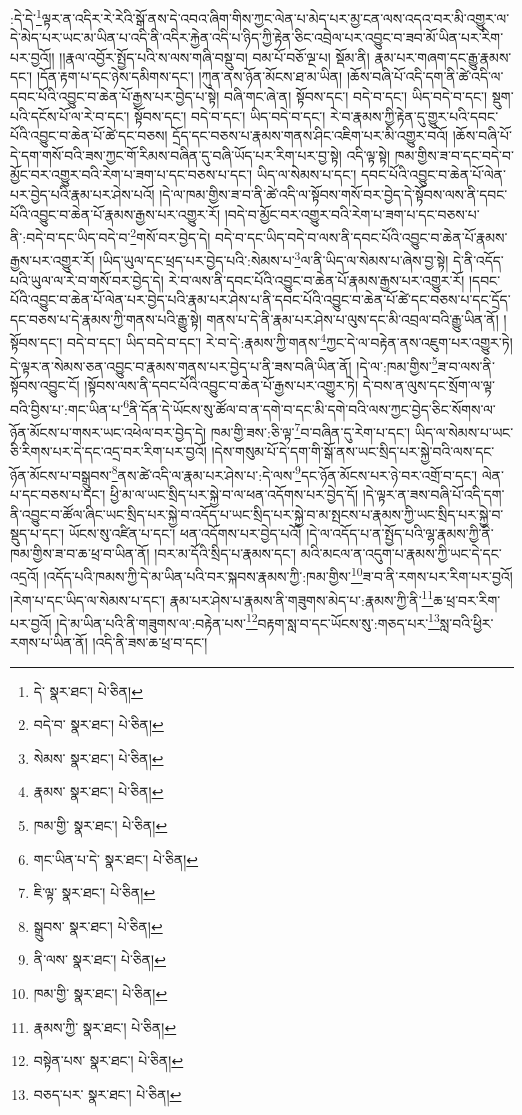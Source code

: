 :དེ་དེ་\footnote{དེ་  སྣར་ཐང་།  པེ་ཅིན། }ལྟར་ན་འདིར་རེ་རེའི་སྒོ་ནས་དེ་འབའ་ཞིག་གིས་ཀྱང་ལེན་པ་མེད་པར་མྱ་ངན་ལས་འདའ་བར་མི་འགྱུར་ལ་དེ་མེད་པར་ཡང་མ་ཡིན་པ་འདི་ནི་འདིར་རྐྱེན་འདི་པ་ཉིད་ཀྱི་རྟེན་ཅིང་འབྲེལ་པར་འབྱུང་བ་ཟབ་མོ་ཡིན་པར་རིག་པར་བྱའོ།། །།རྣལ་འབྱོར་སྤྱོད་པའི་ས་ལས་གཞི་བསྡུ་བ། བམ་པོ་བཅོ་ལྔ་པ། སྡོམ་ནི། རྣམ་པར་གཞག་དང་རྒྱུ་རྣམས་དང་། །དོན་རྟག་པ་དང་ཉེས་དམིགས་དང་། །ཀུན་ནས་ཉོན་མོངས་ཐ་མ་ཡིན། །ཆོས་བཞི་པོ་འདི་དག་ནི་ཚེ་འདི་ལ་དབང་པོའི་འབྱུང་བ་ཆེན་པོ་རྒྱས་པར་བྱེད་པ་སྟེ། བཞི་གང་ཞེ་ན། སྟོབས་དང་། བདེ་བ་དང་། ཡིད་བདེ་བ་དང་། སྡུག་པའི་དངོས་པོ་ལ་རེ་བ་དང་། སྟོབས་དང་། བདེ་བ་དང་། ཡིད་བདེ་བ་དང་། རེ་བ་རྣམས་ཀྱི་རྟེན་དུ་གྱུར་པའི་དབང་པོའི་འབྱུང་བ་ཆེན་པོ་ཚེ་དང་བཅས། དྲོད་དང་བཅས་པ་རྣམས་གནས་ཤིང་འཇིག་པར་མི་འགྱུར་བའོ། །ཆོས་བཞི་པོ་དེ་དག་གསོ་བའི་ཟས་ཀྱང་གོ་རིམས་བཞིན་དུ་བཞི་ཡོད་པར་རིག་པར་བྱ་སྟེ། འདི་ལྟ་སྟེ། ཁམ་གྱིས་ཟ་བ་དང་བདེ་བ་མྱོང་བར་འགྱུར་བའི་རེག་པ་ཟག་པ་དང་བཅས་པ་དང་། ཡིད་ལ་སེམས་པ་དང་། དབང་པོའི་འབྱུང་བ་ཆེན་པོ་ལེན་པར་བྱེད་པའི་རྣམ་པར་ཤེས་པའོ། །དེ་ལ་ཁམ་གྱིས་ཟ་བ་ནི་ཚེ་འདི་ལ་སྟོབས་གསོ་བར་བྱེད་དེ་སྟོབས་ལས་ནི་དབང་པོའི་འབྱུང་བ་ཆེན་པོ་རྣམས་རྒྱས་པར་འགྱུར་རོ། །བདེ་བ་མྱོང་བར་འགྱུར་བའི་རེག་པ་ཟག་པ་དང་བཅས་པ་ནི་:བདེ་བ་དང་ཡིད་བདེ་བ་\footnote{བདེ་བ་  སྣར་ཐང་།  པེ་ཅིན། }གསོ་བར་བྱེད་དེ། བདེ་བ་དང་ཡིད་བདེ་བ་ལས་ནི་དབང་པོའི་འབྱུང་བ་ཆེན་པོ་རྣམས་རྒྱས་པར་འགྱུར་རོ། །ཡིད་ཡུལ་དང་ཕྲད་པར་བྱེད་པའི་:སེམས་པ་\footnote{སེམས་  སྣར་ཐང་།  པེ་ཅིན། }ལ་ནི་ཡིད་ལ་སེམས་པ་ཞེས་བྱ་སྟེ། དེ་ནི་འདོད་པའི་ཡུལ་ལ་རེ་བ་གསོ་བར་བྱེད་དེ། རེ་བ་ལས་ནི་དབང་པོའི་འབྱུང་བ་ཆེན་པོ་རྣམས་རྒྱས་པར་འགྱུར་རོ། །དབང་པོའི་འབྱུང་བ་ཆེན་པོ་ལེན་པར་བྱེད་པའི་རྣམ་པར་ཤེས་པ་ནི་དབང་པོའི་འབྱུང་བ་ཆེན་པོ་ཚེ་དང་བཅས་པ་དང་དྲོད་དང་བཅས་པ་དེ་རྣམས་ཀྱི་གནས་པའི་རྒྱུ་སྟེ། གནས་པ་དེ་ནི་རྣམ་པར་ཤེས་པ་ལུས་དང་མི་འབྲལ་བའི་རྒྱུ་ཡིན་ནོ། །སྟོབས་དང་། བདེ་བ་དང་། ཡིད་བདེ་བ་དང་། རེ་བ་དེ་:རྣམས་ཀྱི་གནས་\footnote{རྣམས་  སྣར་ཐང་།  པེ་ཅིན། }ཀྱང་དེ་ལ་བརྟེན་ནས་འཇུག་པར་འགྱུར་ཏེ། དེ་ལྟར་ན་སེམས་ཅན་འབྱུང་བ་རྣམས་གནས་པར་བྱེད་པ་ནི་ཟས་བཞི་ཡིན་ནོ། །དེ་ལ་:ཁམ་གྱིས་\footnote{ཁམ་གྱི་  སྣར་ཐང་།  པེ་ཅིན། }ཟ་བ་ལས་ནི་སྟོབས་འབྱུང་ངོ། །སྟོབས་ལས་ནི་དབང་པོའི་འབྱུང་བ་ཆེན་པོ་རྒྱས་པར་འགྱུར་ཏེ། དེ་བས་ན་ལུས་དང་སྲོག་ལ་ལྟ་བའི་བྱིས་པ་:གང་ཡིན་པ་\footnote{གང་ཡིན་པ་དེ་  སྣར་ཐང་།  པེ་ཅིན། }ནི་དོན་དེ་ཡོངས་སུ་ཚོལ་བ་ན་དགེ་བ་དང་མི་དགེ་བའི་ལས་ཀྱང་བྱེད་ཅིང་སོགས་ལ་ཉོན་མོངས་པ་གསར་ཡང་འཕེལ་བར་བྱེད་དེ། ཁམ་གྱི་ཟས་:ཅི་ལྟ་\footnote{ཇི་ལྟ་  སྣར་ཐང་།  པེ་ཅིན། }བ་བཞིན་དུ་རེག་པ་དང་། ཡིད་ལ་སེམས་པ་ཡང་ཅི་རིགས་པར་དེ་དང་འདྲ་བར་རིག་པར་བྱའོ། །དེས་གསུམ་པོ་དེ་དག་གི་སྒོ་ནས་ཡང་སྲིད་པར་སྐྱེ་བའི་ལས་དང་ཉོན་མོངས་པ་བསྒྲུབས་\footnote{སྒྲུབས་  སྣར་ཐང་།  པེ་ཅིན། }ནས་ཚེ་འདི་ལ་རྣམ་པར་ཤེས་པ་:དེ་ལས་\footnote{ནི་ལས་  སྣར་ཐང་།  པེ་ཅིན། }དང་ཉོན་མོངས་པར་ཉེ་བར་འགྲོ་བ་དང་། ལེན་པ་དང་བཅས་པ་དང་། ཕྱི་མ་ལ་ཡང་སྲིད་པར་སྐྱེ་བ་ལ་ཕན་འདོགས་པར་བྱེད་དོ། །དེ་ལྟར་ན་ཟས་བཞི་པོ་འདི་དག་ནི་འབྱུང་བ་ཚོལ་ཞིང་ཡང་སྲིད་པར་སྐྱེ་བ་འདོད་པ་ཡང་སྲིད་པར་སྐྱེ་བ་མ་སྤངས་པ་རྣམས་ཀྱི་ཡང་སྲིད་པར་སྐྱེ་བ་སྡུད་པ་དང་། ཡོངས་སུ་འཛིན་པ་དང་། ཕན་འདོགས་པར་བྱེད་པའོ། །དེ་ལ་འདོད་པ་ན་སྤྱོད་པའི་ལྷ་རྣམས་ཀྱི་ནི་ཁམ་གྱིས་ཟ་བ་ཆ་ཕྲ་བ་ཡིན་ནོ། །བར་མ་དོའི་སྲིད་པ་རྣམས་དང་། མའི་མངལ་ན་འདུག་པ་རྣམས་ཀྱི་ཡང་དེ་དང་འདྲའོ། །འདོད་པའི་ཁམས་ཀྱི་དེ་མ་ཡིན་པའི་བར་སྐབས་རྣམས་ཀྱི་:ཁམ་གྱིས་\footnote{ཁམ་གྱི་  སྣར་ཐང་།  པེ་ཅིན། }ཟ་བ་ནི་རགས་པར་རིག་པར་བྱའོ། །རེག་པ་དང་ཡིད་ལ་སེམས་པ་དང་། རྣམ་པར་ཤེས་པ་རྣམས་ནི་གཟུགས་མེད་པ་:རྣམས་ཀྱི་ནི་\footnote{རྣམས་ཀྱི་  སྣར་ཐང་།  པེ་ཅིན། }ཆ་ཕྲ་བར་རིག་པར་བྱའོ། །དེ་མ་ཡིན་པའི་ནི་གཟུགས་ལ་:བརྟེན་པས་\footnote{བསྟེན་པས་  སྣར་ཐང་།  པེ་ཅིན། }བརྟག་སླ་བ་དང་ཡོངས་སུ་:གཅད་པར་\footnote{བཅད་པར་  སྣར་ཐང་།  པེ་ཅིན། }སླ་བའི་ཕྱིར་རགས་པ་ཡིན་ནོ། །འདི་ནི་ཟས་ཆ་ཕྲ་བ་དང་། 
